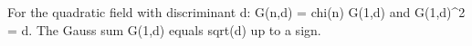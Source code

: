 For the quadratic field with discriminant d: G(n,d) = chi(n) G(1,d) and G(1,d)^2 = d. The Gauss sum G(1,d) equals sqrt(d) up to a sign.
